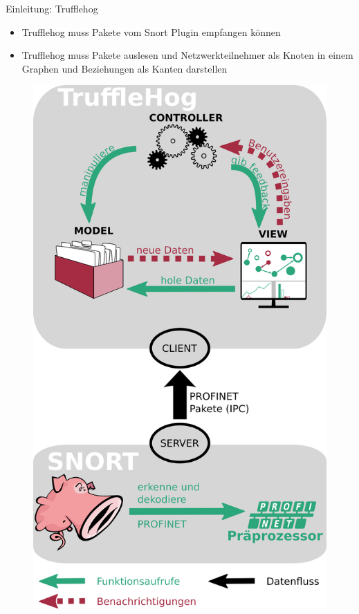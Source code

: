\documentclass[18pt]{beamer}
\begin{document}
\begin{frame}{Einleitung: Trufflehog}
    \begin{itemize}
      \item Trufflehog muss Pakete vom Snort Plugin empfangen können
      \pause
      \item Trufflehog muss Pakete auslesen und Netzwerkteilnehmer als Knoten in einem Graphen
   und Beziehungen als Kanten darstellen
    \end{itemize}
\end{frame}


\begin{frame}
    \begin{figure}
    	\centering
    	\includegraphics[height=0.9\textheight]{./images/intro_diagram.png}
    \end{figure}
\end{frame}
\end{document}
